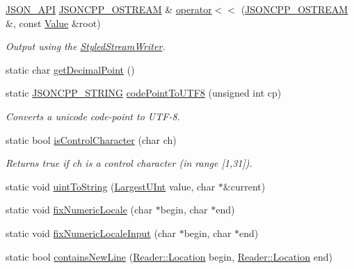 \begin{DoxyCompactItemize}
\item 
\hyperlink{json_8h_a1d61ffde86ce1a18fd83194ff0d9a206}{J\+S\+O\+N\+\_\+\+A\+PI} \hyperlink{json_8h_a37a25be5fca174927780caeb280094ce}{J\+S\+O\+N\+C\+P\+P\+\_\+\+O\+S\+T\+R\+E\+AM} \& \hyperlink{namespace_json_a975d1dbca8aa7a06f38d373edcb9081c}{operator$<$$<$} (\hyperlink{json_8h_a37a25be5fca174927780caeb280094ce}{J\+S\+O\+N\+C\+P\+P\+\_\+\+O\+S\+T\+R\+E\+AM} \&, const \hyperlink{class_json_1_1_value}{Value} \&root)
\begin{DoxyCompactList}\small\item\em Output using the \hyperlink{class_json_1_1_styled_stream_writer}{Styled\+Stream\+Writer}. \end{DoxyCompactList}\item 
static char \hyperlink{namespace_json_ac99d7a5551039dfa712dd1d143c25a16}{get\+Decimal\+Point} ()
\item 
static \hyperlink{json_8h_a1e723f95759de062585bc4a8fd3fa4be}{J\+S\+O\+N\+C\+P\+P\+\_\+\+S\+T\+R\+I\+NG} \hyperlink{namespace_json_a33f8bda65a5b1fc4f5ddc39cb03dc742}{code\+Point\+To\+U\+T\+F8} (unsigned int cp)
\begin{DoxyCompactList}\small\item\em Converts a unicode code-\/point to U\+T\+F-\/8. \end{DoxyCompactList}\item 
static bool \hyperlink{namespace_json_a0381e631737f51331065a388f4f59197}{is\+Control\+Character} (char ch)
\begin{DoxyCompactList}\small\item\em Returns true if ch is a control character (in range \mbox{[}1,31\mbox{]}). \end{DoxyCompactList}\item 
static void \hyperlink{namespace_json_ac1ffd21a9e55122014353c773ccc496e}{uint\+To\+String} (\hyperlink{namespace_json_ae202ecad69725e23443f465e257456d0}{Largest\+U\+Int} value, char $\ast$\&current)
\item 
static void \hyperlink{namespace_json_aa208904144dc7b11ccc28f47c9afab9a}{fix\+Numeric\+Locale} (char $\ast$begin, char $\ast$end)
\item 
static void \hyperlink{namespace_json_ac142c270507391c8d86f35b550d36eb4}{fix\+Numeric\+Locale\+Input} (char $\ast$begin, char $\ast$end)
\item 
static bool \hyperlink{namespace_json_a4d6ab0f651348832e5cc49b577a854d2}{contains\+New\+Line} (\hyperlink{class_json_1_1_reader_a46795b5b272bf79a7730e406cb96375a}{Reader\+::\+Location} begin, \hyperlink{class_json_1_1_reader_a46795b5b272bf79a7730e406cb96375a}{Reader\+::\+Location} end)

\end{DoxyCompactItemize}
